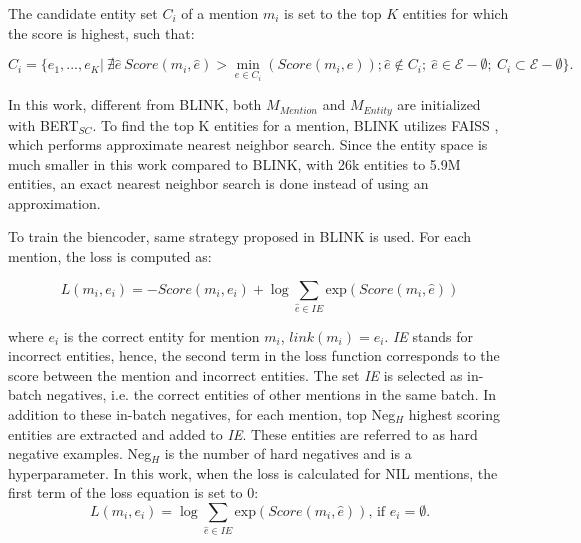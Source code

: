\documentclass{report}
\theoremstyle{definition}
\theoremstyle{remark}
\begin{document}
The candidate entity set $C_i$ of a mention $m_i$ is set to the top $K$ entities for which the score is highest, such that:

\begin{equation}
    C_i = \{e_1,...,e_K | \ \nexists\hat{e} \ Score(m_i,\hat{e}) > \min_{e\in C_i}(Score(m_i, e )); \hat{e} \notin C_i; \ \hat{e} \in \mathcal{E}-\emptyset; \ C_i \subset \mathcal{E}-\emptyset  \}.
\end{equation}

In this work, different from BLINK, both $M_{Mention}$ and $M_{Entity}$ are initialized with BERT$_{SC}$. To find the top K entities for a mention, BLINK utilizes FAISS \cite{faiss}, which performs approximate nearest neighbor search. Since the entity space is much smaller in this work compared to BLINK, with 26k entities to 5.9M entities, an exact nearest neighbor search is done instead of using an approximation.

To train the biencoder, same strategy proposed in BLINK is used. For each mention, the loss is computed as:

\begin{equation}
    L(m_i,e_i) = -Score(m_i,e_i) + \log \sum_{\hat{e} \in IE} \text{exp}( Score(m_i,\hat{e}))
\end{equation}

\noindent where $e_i$ is the correct entity for mention $m_i$, $link(m_i)=e_i$. \textit{IE} stands for incorrect entities, hence, the second term in the loss function corresponds to the score between the mention and incorrect entities. The set \textit{IE} is selected as in-batch negatives, i.e. the correct entities of other mentions in the same batch. In addition to these in-batch negatives, for each mention, top Neg$_H$ highest scoring entities are extracted and added to \textit{IE}. These entities are referred to as hard negative examples. Neg$_H$ is the number of hard negatives and is a hyperparameter. In this work, when the loss is calculated for NIL mentions, the first term of the loss equation is set to 0:
\begin{equation}
    L(m_i,e_i) = \log \sum_{\hat{e} \in IE} \text{exp}( Score(m_i,\hat{e})) \text{, if } e_i = \emptyset.
\end{equation}
\end{document}
